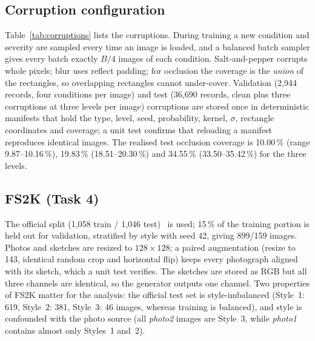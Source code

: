 \documentclass[conference]{IEEEtran}
\begin{document}
\subsection{Corruption configuration}
\begin{table}[t]\centering\caption{Corruption configuration (assignment specification).}\label{tab:corruptions}\footnotesize
\setlength{\tabcolsep}{3pt}
\end{table}
Table~\ref{tab:corruptions} lists the corruptions. During training a new condition and severity are sampled
every time an image is loaded, and a balanced batch sampler gives every batch exactly $B/4$ images of each
condition. Salt-and-pepper corrupts whole pixels; blur uses reflect padding; for occlusion the coverage is
the \emph{union} of the rectangles, so overlapping rectangles cannot under-cover. Validation (2,944 records,
four conditions per image) and test (36,690 records, clean plus three corruptions at three levels per image)
corruptions are stored once in deterministic manifests that hold the type, level, seed, probability, kernel,
$\sigma$, rectangle coordinates and coverage; a unit test confirms that reloading a manifest reproduces
identical images. The realised test occlusion coverage is 10.00\,\% (range 9.87--10.16\,\%), 19.83\,\%
(18.51--20.30\,\%) and 34.55\,\% (33.50--35.42\,\%) for the three levels.

\subsection{FS2K (Task 4)}\label{sec:fs2k_ref}
The official split (1,058 train / 1,046 test)~\cite{fan2022fs2k} is used; 15\,\% of the training portion
is held out for validation, stratified by style with seed 42, giving 899/159 images. Photos and sketches
are resized to $128\times128$; a paired augmentation (resize to 143, identical random crop and horizontal
flip) keeps every photograph aligned with its sketch, which a unit test verifies. The sketches are stored as
RGB but all three channels are identical, so the generator outputs one channel. Two properties of FS2K
matter for the analysis: the official test set is style-imbalanced (Style~1: 619, Style~2: 381,
Style~3: 46 images, whereas training is balanced), and style is confounded with the photo source (all
\emph{photo2} images are Style~3, while \emph{photo1} contains almost only Styles~1 and~2).
\end{document}

